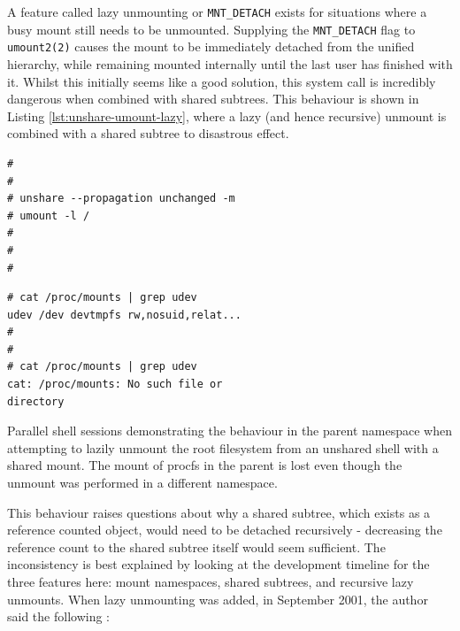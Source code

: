 \documentclass[12pt,a4paper,twoside]{report}
\begin{document}
A feature called lazy unmounting or \texttt{MNT\_DETACH} exists for situations where a busy mount still needs to be unmounted. Supplying the \texttt{MNT\_DETACH} flag to \texttt{umount2(2)} causes the mount to be immediately detached from the unified hierarchy, while remaining mounted internally until the last user has finished with it. Whilst this initially seems like a good solution, this system call is incredibly dangerous when combined with shared subtrees. This behaviour is shown in Listing \ref{lst:unshare-umount-lazy}, where a lazy (and hence recursive) unmount is combined with a shared subtree to disastrous effect.

\begin{listing}
\begin{minipage}{.49\textwidth}

\begin{verbatim}
#
#
# unshare --propagation unchanged -m
# umount -l /
#
#
#
\end{verbatim}

\end{minipage}
\hfill
\begin{minipage}{.49\textwidth}

\begin{verbatim}
# cat /proc/mounts | grep udev
udev /dev devtmpfs rw,nosuid,relat...
#
#
# cat /proc/mounts | grep udev
cat: /proc/mounts: No such file or
directory
\end{verbatim}

\end{minipage}

\caption{Parallel shell sessions demonstrating the behaviour in the parent namespace when attempting to lazily unmount the root filesystem from an unshared shell with a shared mount. The mount of procfs in the parent is lost even though the unmount was performed in a different namespace.}
\label{lst:unshare-umount-lazy}
\end{listing}

This behaviour raises questions about why a shared subtree, which exists as a reference counted object, would need to be detached recursively - decreasing the reference count to the shared subtree itself would seem sufficient. The inconsistency is best explained by looking at the development timeline for the three features here: mount namespaces, shared subtrees, and recursive lazy unmounts. When lazy unmounting was added, in September 2001, the author said the following \citep{viro_patch_2001}:
\end{document}
